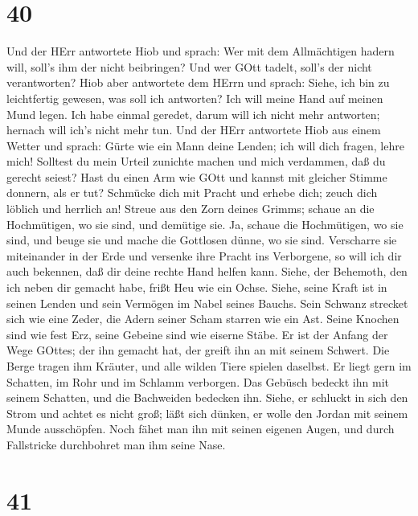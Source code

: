 \hypertarget{section-39}{%
\section{40}\label{section-39}}

 Und der HErr antwortete Hiob und sprach:  Wer
mit dem Allmächtigen hadern will, soll's ihm der nicht beibringen? Und
wer GOtt tadelt, soll's der nicht verantworten?  Hiob aber
antwortete dem HErrn und sprach:  Siehe, ich bin zu
leichtfertig gewesen, was soll ich antworten? Ich will meine Hand auf
meinen Mund legen.  Ich habe einmal geredet, darum will ich
nicht mehr antworten; hernach will ich's nicht mehr tun. 
Und der HErr antwortete Hiob aus einem Wetter und sprach: 
Gürte wie ein Mann deine Lenden; ich will dich fragen, lehre mich!
 Solltest du mein Urteil zunichte machen und mich verdammen,
daß du gerecht seiest?  Hast du einen Arm wie GOtt und
kannst mit gleicher Stimme donnern, als er tut?  Schmücke
dich mit Pracht und erhebe dich; zeuch dich löblich und herrlich an!
 Streue aus den Zorn deines Grimms; schaue an die
Hochmütigen, wo sie sind, und demütige sie.  Ja, schaue die
Hochmütigen, wo sie sind, und beuge sie und mache die Gottlosen dünne,
wo sie sind.  Verscharre sie miteinander in der Erde und
versenke ihre Pracht ins Verborgene,  so will ich dir auch
bekennen, daß dir deine rechte Hand helfen kann.  Siehe,
der Behemoth, den ich neben dir gemacht habe, frißt Heu wie ein Ochse.
 Siehe, seine Kraft ist in seinen Lenden und sein Vermögen
im Nabel seines Bauchs.  Sein Schwanz strecket sich wie
eine Zeder, die Adern seiner Scham starren wie ein Ast. 
Seine Knochen sind wie fest Erz, seine Gebeine sind wie eiserne Stäbe.
 Er ist der Anfang der Wege GOttes; der ihn gemacht hat,
der greift ihn an mit seinem Schwert.  Die Berge tragen ihm
Kräuter, und alle wilden Tiere spielen daselbst.  Er liegt
gern im Schatten, im Rohr und im Schlamm verborgen.  Das
Gebüsch bedeckt ihn mit seinem Schatten, und die Bachweiden bedecken
ihn.  Siehe, er schluckt in sich den Strom und achtet es
nicht groß; läßt sich dünken, er wolle den Jordan mit seinem Munde
ausschöpfen.  Noch fähet man ihn mit seinen eigenen Augen,
und durch Fallstricke durchbohret man ihm seine Nase.

\hypertarget{section-40}{%
\section{41}\label{section-40}}

